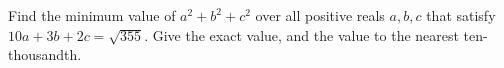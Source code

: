 Find the minimum value of $a^2+b^2+c^2$ over all positive reals $a,b,c$ that satisfy $10a+3b+2c=\sqrt{355}$. Give the exact value, and the value to the nearest ten-thousandth.
